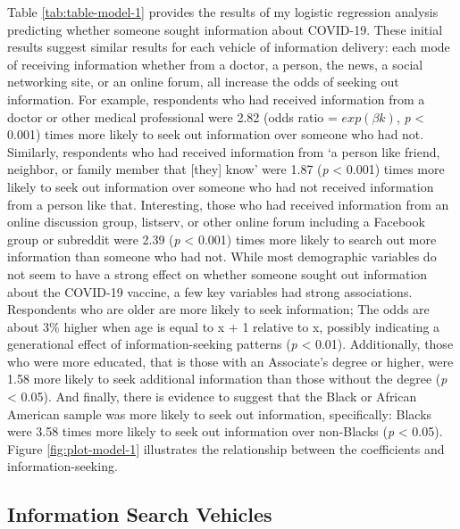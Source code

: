 Table \ref{tab:table-model-1} provides the results of my logistic regression
analysis predicting whether someone sought information about COVID-19. These
initial results suggest similar results for each vehicle of information
delivery: each mode of receiving information whether from a doctor, a person,
the news, a social networking site, or an online forum, all increase the odds of
seeking out information. For example, respondents who had received information
from a doctor or other medical professional were 2.82 (odds ratio = \(exp(\beta k)\),
\emph{p} \textless{} 0.001) times more likely to seek out information over someone
who had not. Similarly, respondents who had received information from `a
person like friend, neighbor, or family member that [they] know' were 1.87
(\emph{p} \textless{} 0.001) times more likely to seek out information over 
someone who had not received information from a person like that. Interesting, 
those who had received information from an online discussion group, listserv,
or other online forum including a Facebook group or subreddit were 2.39 (\emph{p}
\textless{} 0.001) times more likely to search out more information than 
someone who had not. While most demographic variables do not seem to have a 
strong effect on whether someone sought out information about the COVID-19 
vaccine, a few key variables had strong associations.  Respondents who are 
older are more likely to seek information; The odds are about 3\% higher when 
age is equal to x + 1 relative to x, possibly indicating a generational effect
of information-seeking patterns (\emph{p} \textless{} 0.01). Additionally,
those who were more educated, that is those with an Associate's degree or higher,
were 1.58 more likely to seek additional information than those without the degree
(\emph{p} \textless{} 0.05). And finally, there is evidence to suggest that the Black or
African American sample was more likely to seek out information, specifically:
Blacks were 3.58 times more likely to seek out information over non-Blacks (\emph{p}
\textless{} 0.05). Figure \ref{fig:plot-model-1} illustrates the relationship
between the coefficients and information-seeking.

\hypertarget{information-search-vehicles}{%
\subsection{Information Search Vehicles}\label{information-search-vehicles}}



